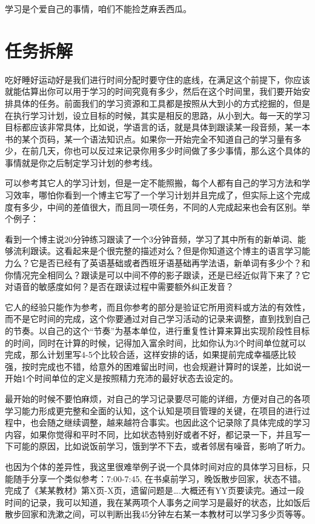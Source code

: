 \documentclass[
]{book}
\begin{document}
学习是个爱自己的事情，咱们不能捡芝麻丢西瓜。

\hypertarget{ux4efbux52a1ux62c6ux89e3}{%
\section{任务拆解}\label{ux4efbux52a1ux62c6ux89e3}}

吃好睡好运动好是我们进行时间分配时要守住的底线，在满足这个前提下，你应该就能估算出你可以用于学习的时间究竟有多少，然后在这个时间里，我们要开始安排具体的任务。前面我们的学习资源和工具都是按照从大到小的方式挖掘的，但是在执行学习计划，设立目标的时候，其实是相反的思路，从小到大。每一天的学习目标都应该非常具体，比如说，学语言的话，就是具体到跟读某一段音频，某一本书的某个页码，某一个语法知识点。如果你一开始完全不知道自己的学习量有多少，在前几天，你也可以反过来记录你用多少时间做了多少事情，那么这个具体的事情就是你之后制定学习计划的参考线。

可以参考其它人的学习计划，但是一定不能照搬，每个人都有自己的学习方法和学习效率，哪怕你看到一个博主它写了一个学习计划并且完成了，但实际上这个完成度有多少，中间的差值很大，而且同一项任务，不同的人完成起来也会有区别。举个例子：

看到一个博主说20分钟练习跟读了一个3分钟音频，学习了其中所有的新单词、能够流利跟读。这看起来是个很完整的描述对么？但是你知道这个博主的语言学习能力么？它是否已经有了英语基础或者西班牙语基础再学法语，新单词有多少个？和你情况完全相同么？跟读是可以中间不停的影子跟读，还是已经近似背下来了？它对语音的敏感度如何？是否在跟读过程中需要额外纠正发音？

它人的经验只能作为参考，而且你参考的部分是验证它所用资料或方法的有效性，而不是它时间的完成，这个你要通过对自己学习活动的记录来调整，直到找到自己的节奏。以自己的这个``节奏''为基本单位，进行重复性计算来算出实现阶段性目标的时间，同时在计算的时候，记得加入富余时间，比如你认为3个时间单位就可以完成，那么计划里写4-5个比较合适，这样安排的话，如果提前完成幸福感比较强，按时完成也不错，给意外的困难留出时间，也会规避计算时的误差，比如说一开始1个时间单位的定义是按照精力充沛的最好状态去设定的。

最开始的时候不要怕麻烦，对自己的学习记录要尽可能的详细，方便对自己的各项学习能力形成更完整和全面的认知，这个认知是项目管理的关键，在项目的进行过程中，也会随之继续调整，越来越符合事实。也因此这个记录除了具体完成的学习内容，如果你觉得和平时不同，比如状态特别好或者不好，都记录一下，并且写一下可能的原因，比如说饭前学习，饿到学不下去，或者邻居有噪音，影响了听力。

也因为个体的差异性，我这里很难举例子说一个具体时间对应的具体学习目标，只能随手分享一个类似参考：7:00-7:45, 在书桌前学习，晚饭散步回家，状态不错。完成了《某某教材》第X页-X页，遗留问题是\ldots.大概还有YY页要读完。通过一段时间的记录，我可以知道，我在某两项个人事务之间学习是最好的状态，比如饭后散步回家和洗漱之间，可以判断出我45分钟左右某一本教材可以学习多少页等等。
\end{document}
